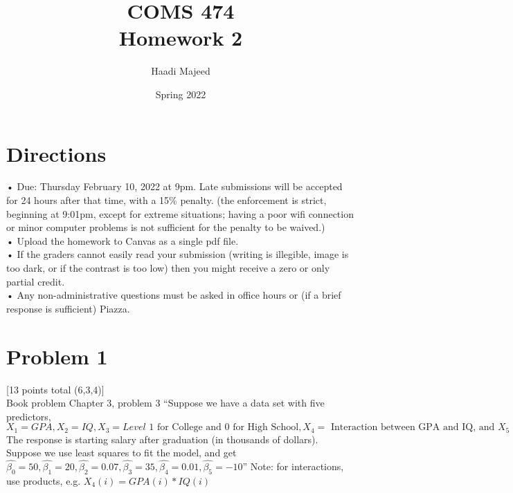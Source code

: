 \documentclass[12pt]{article}
\title{ COMS 474\\Homework 2 }
\author{ Haadi Majeed }
\date{Spring 2022}
\begin{document}
\maketitle
\pagebreak

\section*{Directions}
• Due: Thursday February 10, 2022 at 9pm. Late submissions will be accepted for
24 hours after that time, with a 15\% penalty. (the enforcement is strict, beginning at
9:01pm, except for extreme situations; having a poor wifi connection or minor computer
problems is not sufficient for the penalty to be waived.)
\\• Upload the homework to Canvas as a single pdf file.
\\• If the graders cannot easily read your submission (writing is illegible, image is too dark,
or if the contrast is too low) then you might receive a zero or only partial credit.
\\• Any non-administrative questions must be asked in office hours or (if a brief response
is sufficient) Piazza.

\pagebreak
\section*{Problem 1}
 [13 points total (6,3,4)]\\
Book problem Chapter 3, problem 3 “Suppose we have a data set with five predictors, $X_1 = GPA, X_2 = IQ, X_3 = Level \text{ 1 for College and 0 for High School}, X_4 = \text{ Interaction between GPA and IQ, and } X_5 = \text{Interaction between GPA and Level.}$  The response is starting salary after graduation (in thousands of dollars).  Suppose we use least squares to fit the model, and get $ \hat{\beta_0} = 50, \hat{\beta_1} = 20, \hat{\beta_2} = 0.07, \hat{\beta_3} = 35, \hat{\beta_4} = 0.01, \hat{\beta_5} = -10$” \newline
Note: for interactions, use products, e.g. $X_4(i) = GPA(i) * IQ(i)$
\end{document}
